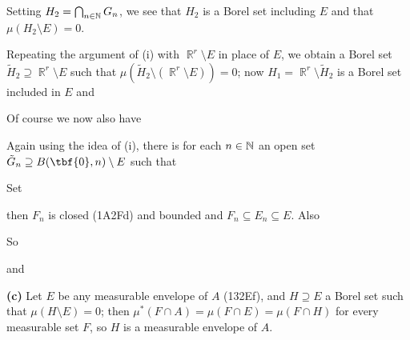 {
     
\noindent Setting $H_2=\bigcap_{n\in\Bbb N}G_n$, we see that $H_2$ is a
Borel set including $E$ and that $\mu(H_2\setminus E)=0$.
     
\medskip
     
 Repeating the argument of (i) with $\BbbR^r\setminus E$
in place of $E$, we obtain
a Borel set $\tilde H_2\supseteq\BbbR^r\setminus E$ such that
$\mu(\tilde H_2\setminus(\BbbR^r\setminus E))=0$;  now
$H_1=\BbbR^r\setminus \tilde H_2$ is a Borel set included in $E$ and
     
     
\noindent Of course we now also have
     
     
\medskip
     
 Again using the idea of (i), there is for each
$n\in\Bbb N$
an open set $\tilde G_n\supseteq B(\tbf{0},n)\setminus E$ such that
     
     
\noindent Set
     
     
\noindent  then $F_n$ is
closed (1A2Fd) and bounded and $F_n\subseteq E_n\subseteq E$.
Also
     
     
\noindent So
     
     
\noindent and
     
     
\medskip
     
{\bf (c)} Let $E$ be any measurable envelope of $A$ (132Ef), and
$H\supseteq E$ a Borel set such that $\mu(H\setminus E)=0$;  then
$\mu^*(F\cap A)=\mu(F\cap E)=\mu(F\cap H)$ for every measurable set $F$,
so $H$ is a measurable envelope of $A$.
     
}
